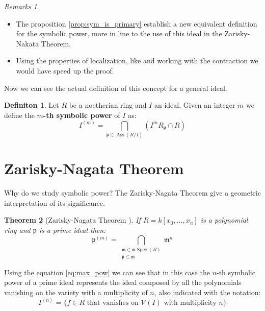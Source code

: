 \documentclass[]{book}
\theoremstyle{plain}
\newtheorem{teo}{Theorem}[section]
\theoremstyle{remark}
\newtheorem{rems}[rem]{Remarks}
\theoremstyle{definition}
\newtheorem{deff}[teo]{Definiton}
\newcommand{\p}{\mathfrak{p}}
\newcommand{\mm}{\mathfrak{m}}
\DeclareMathOperator{\Ass}{Ass}
\DeclareMathOperator{\Spec}{Spec}
\begin{document}
	\begin{rems}
		\begin{itemize}
		\item The proposition \ref{prop:sym_is_primary} establish a new equivalent definition for the symbolic power, more in line to the use of this ideal in the Zarisky-Nakata Theorem.
		\item Using the properties of localization, like \cite[Proposition 4.8]{AMCD} and working with the contraction we would have speed up the proof.
		\end{itemize}
	\end{rems}
	
Now we can see the actual definition of this concept for a general ideal.

\begin{deff}
	Let $ R $ be a noetherian ring and $ I $ an ideal. Given an integer $ m $ we define the \textbf{$ m $-th symbolic power} of $ I $ as:
	\begin{equation}\label{eq:sym_pow_def}
		I^{(m)} = \bigcap_{\p \in \Ass(R/I) } (I^m R_\p \cap R)
	\end{equation}
\end{deff}



\section{Zarisky-Nagata Theorem}
Why do we study symbolic power? The Zarisky-Nagata Theorem give a geometric interpretation of its significance.

\begin{teo}[Zarisky-Nagata Theorem \cite{Zar49, Nagata62}] \label{teo:zarnaga}
	If $ R = k[x_0 , ... , x_n] $ is a polynomial ring and $ \p $ is a prime ideal then:
	\begin{equation}\label{eq:zar_nag_teo}
	\p^{(m)} = \bigcap_{\substack{ \mm \in \mm\Spec (R)\\ \p \subset \mm}} \mm ^n
	\end{equation}
\end{teo}

Using the equation \ref{eq:max_pow} we can see that in this case the $ n $-th symbolic power of a prime ideal represents the ideal composed by all the polynomials vanishing on the variety with a multiplicity of $ n $, also indicated with the notation:
\begin{equation}\label{eq:ideal_vanish}
	I^{\left<n\right>} = \{ f \in R \text{ that vanishes on } \mathcal{V}(I) \text{ with multiplicity } n\}
\end{equation}
\end{document}
